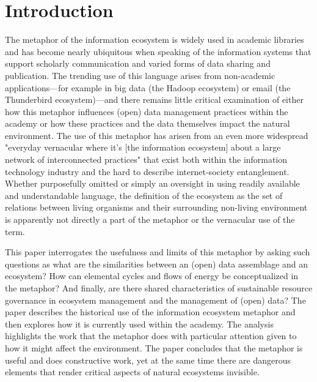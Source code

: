 \section{Introduction}

The metaphor of the information ecosystem is widely used in academic libraries and has become nearly ubiquitous when speaking of the information systems that support scholarly communication and varied forms of data sharing and publication. The trending use of this language arises from non-academic applications—for example in big data (the Hadoop ecosystem) or email (the Thunderbird ecosystem)—and there remains little critical examination of either how this metaphor influences (open) data management practices within the academy or how these practices and the data themselves impact the natural environment. The use of this metaphor has arisen from an even more widespread "everyday vernacular where it’s [the information ecosystem] about a large network of interconnected practices" that exist both within the information technology industry and the hard to describe internet-society entanglement. Whether purposefully omitted or simply an oversight in using readily available and understandable language, the definition of the ecosystem as the set of relations between living organisms and their surrounding non-living environment is apparently not directly a part of the metaphor or the vernacular use of the term. 

This paper interrogates the usefulness and limits of this metaphor by asking such questions as what are the similarities between an (open) data assemblage and an ecosystem? How can elemental cycles and flows of energy be conceptualized in the metaphor? And finally, are there shared characteristics of sustainable resource governance in ecosystem management and the management of (open) data?  The paper describes the historical use of the information ecosystem metaphor and then explores how it is currently used within the academy. The analysis highlights the work that the metaphor does with particular attention given to how it might affect the environment. The paper concludes that the metaphor is useful and does constructive work, yet at the same time there are dangerous elements that render critical aspects of natural ecosystems invisible.
